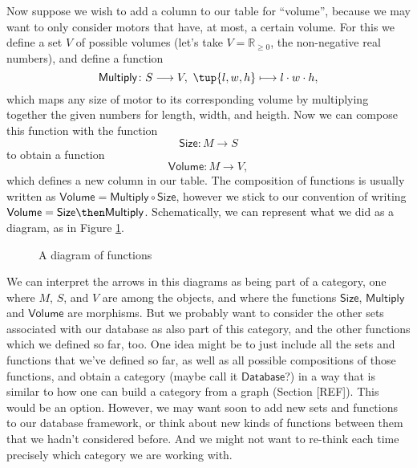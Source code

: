 Now suppose we wish to add a column to our table for ``volume'', because we may want to only consider motors that have, at most, a certain volume. For this we define a set $V$ of possible volumes (let's take $V = \mathbb{R}_{\geq 0}$, the non-negative real numbers), and define a function
\begin{equation*}
\mathsf{Multiply}\colon S \longrightarrow V, \ \tup{l, w, h} \longmapsto l \cdot w \cdot h,
\end{equation*}
which maps any size of motor to its corresponding volume by multiplying together the given numbers for length, width, and heigth.  Now we can compose this function with the function
\begin{equation*}
\mathsf{Size}\colon M \longrightarrow S
\end{equation*}
to obtain a function
\begin{equation*}
\mathsf{Volume}\colon M \longrightarrow V,
\end{equation*}
which defines a new column in our table. The composition of functions is usually written as $\mathsf{Volume} = \mathsf{Multiply} \circ \mathsf{Size}$, however we stick to our convention of writing $\mathsf{Volume} = \mathsf{Size} \then \mathsf{Multiply}$. Schematically, we can represent what we did as a diagram, as in Figure \cref{fig:diagram_functions}.



\begin{figure}[h!]
\begin{center}
\end{center}
\caption{A diagram of functions \label{fig:diagram_functions}}
\end{figure}

We can interpret the arrows in this diagrams as being part of a category, one where $M$, $S$, and $V$ are among the objects, and where the functions $\mathsf{Size}$, $\mathsf{Multiply}$ and $\mathsf{Volume}$ are morphisms. But we probably want to consider the other sets associated with our database as also part of this category, and the other functions which we defined so far, too. One idea might be to just include all the sets and functions that we've defined so far, as well as all possible compositions of those functions, and obtain a category (maybe call it $\mathsf{Database}$?) in a way that is similar to how one can build a category from a graph (Section [REF]). This would be an option. However, we may want soon to add new sets and functions to our database framework, or think about new kinds of functions between them that we hadn't considered before. And we might not want to re-think each time precisely which category we are working with.

